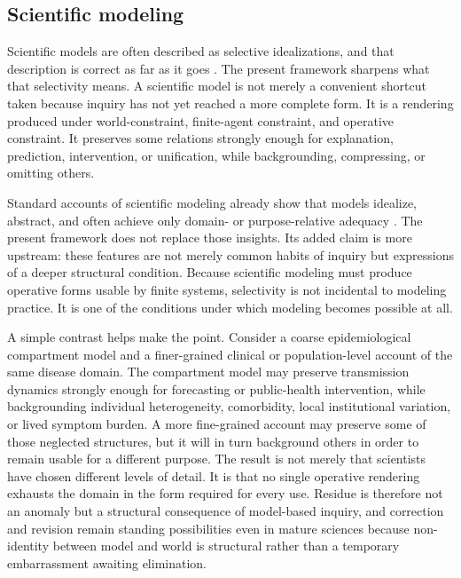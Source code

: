 \documentclass[11pt]{article}
\begin{document}
\subsection{Scientific modeling}

Scientific models are often described as selective idealizations, and that description is correct as far as it goes \cite{FriggHartmann2025ModelsScienceSEP,FriggNguyen2021ScientificRepresentationSEP}. The present framework sharpens what that selectivity means. A scientific model is not merely a convenient shortcut taken because inquiry has not yet reached a more complete form. It is a rendering produced under world-constraint, finite-agent constraint, and operative constraint. It preserves some relations strongly enough for explanation, prediction, intervention, or unification, while backgrounding, compressing, or omitting others.

Standard accounts of scientific modeling already show that models idealize, abstract, and often achieve only domain- or purpose-relative adequacy \cite{Giere2006ScientificPerspectivism,Massimi2022PerspectivalRealism,LudwigRuphy2026ScientificPluralismSEP,Chang2022RealismForRealisticPeople}. The present framework does not replace those insights. Its added claim is more upstream: these features are not merely common habits of inquiry but expressions of a deeper structural condition. Because scientific modeling must produce operative forms usable by finite systems, selectivity is not incidental to modeling practice. It is one of the conditions under which modeling becomes possible at all.

A simple contrast helps make the point. Consider a coarse epidemiological compartment model and a finer-grained clinical or population-level account of the same disease domain. The compartment model may preserve transmission dynamics strongly enough for forecasting or public-health intervention, while backgrounding individual heterogeneity, comorbidity, local institutional variation, or lived symptom burden. A more fine-grained account may preserve some of those neglected structures, but it will in turn background others in order to remain usable for a different purpose. The result is not merely that scientists have chosen different levels of detail. It is that no single operative rendering exhausts the domain in the form required for every use. Residue is therefore not an anomaly but a structural consequence of model-based inquiry, and correction and revision remain standing possibilities even in mature sciences because non-identity between model and world is structural rather than a temporary embarrassment awaiting elimination.
\end{document}
